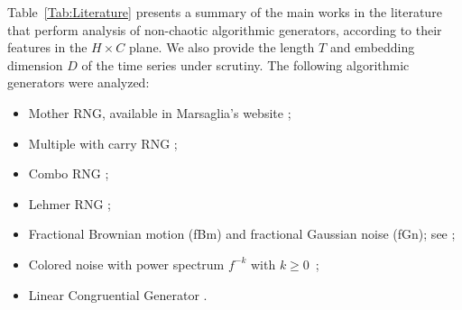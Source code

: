 \documentclass[alpha-refs]{wiley-article}
\begin{document}
Table~\ref{Tab:Literature} presents a summary of the main works in the literature that perform analysis of non-chaotic algorithmic generators, according to their features in the $H\times C$ plane.
We also provide the length $T$ and embedding dimension $D$ of the time series under scrutiny.
The following algorithmic generators were analyzed:
\begin{itemize}
	\item Mother RNG, available in Marsaglia's website \citep[MOT,][]{marsaglia1994yet};
	\item Multiple with carry RNG \citep[MWC,][]{marsaglia1994yet};
	\item Combo RNG \citep[COM,][]{marsaglia1994yet};
	\item Lehmer RNG \citep[LEH,][]{payne1969coding};
	\item Fractional Brownian motion (fBm) and fractional Gaussian noise (fGn); see \citet{bardet2003generators};
	\item Colored noise with power spectrum $f^{-k}$ with $k \geq 0$~\citep{larrondo2012matlab};
	\item Linear Congruential Generator \citep[LCG,][]{knuth1997sorting}.
\end{itemize}
\end{document}
